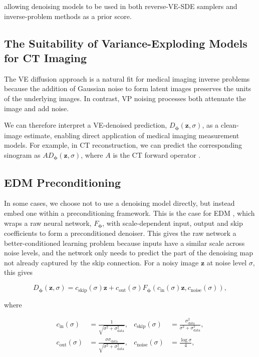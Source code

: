 allowing denoising models to be used in both reverse-VE-SDE samplers and inverse-problem methods as a prior score.

\subsection{The Suitability of Variance-Exploding Models for CT Imaging}
\label{subsec:suitability_ve_ct}

The VE diffusion approach is a natural fit for medical imaging inverse problems because the addition of Gaussian noise to form latent images preserves the units of the underlying images. In contrast, VP noising processes both attenuate the image and add noise.

We can therefore interpret a VE-denoised prediction, $D_{\boldsymbol{\phi}}(\mathbf{z},\sigma)$, as a clean-image estimate, enabling direct application of medical imaging measurement models. For example, in CT reconstruction, we can predict the corresponding sinogram as $AD_{\boldsymbol{\phi}}(\mathbf{z},\sigma)$, where $A$ is the CT forward operator \cite{SongMedicalInverse, ChungYeMRI, DPS}.

\subsection{EDM Preconditioning} \label{subsec:edm_preconditioning}

In some cases, we choose not to use a denoising model directly, but instead embed one within a preconditioning framework. This is the case for EDM \cite{Karras_edm}, which wraps a raw neural network, $F_{\boldsymbol{\phi}}$, with scale-dependent input, output and skip coefficients to form a preconditioned denoiser. This gives the raw network a better-conditioned learning problem because inputs have a similar scale across noise levels, and the network only needs to predict the part of the denoising map not already captured by the skip connection. For a noisy image $\mathbf{z}$ at noise level $\sigma$, this gives

\begin{equation} D_{\boldsymbol{\phi}}(\mathbf{z},\sigma) =
c_{\mathrm{skip}}(\sigma)\mathbf{z} + c_{\mathrm{out}}(\sigma)
F_{\boldsymbol{\phi}} \left( c_{\mathrm{in}}(\sigma)\mathbf{z},
c_{\mathrm{noise}}(\sigma) \right), \label{eq:edm_preconditioned_denoiser}
\end{equation}

where

\begin{align} c_{\mathrm{in}}(\sigma) &=
\frac{1}{\sqrt{\sigma^2+\sigma_{\mathrm{data}}^2}}, & c_{\mathrm{skip}}(\sigma)
&= \frac{\sigma_{\mathrm{data}}^2}{\sigma^2+\sigma_{\mathrm{data}}^2}, \\
c_{\mathrm{out}}(\sigma) &=
\frac{\sigma\sigma_{\mathrm{data}}}{\sqrt{\sigma^2+\sigma_{\mathrm{data}}^2}}, &
c_{\mathrm{noise}}(\sigma) &= \frac{\log \sigma}{4},
\label{eq:edm_preconditioning_coefficients} \end{align}

